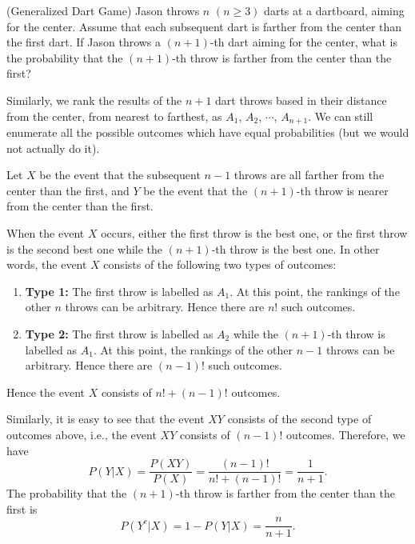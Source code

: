 \documentclass[12pt,letterpaper, onecolumn]{exam}
\begin{document}
\begin{questions}
    \question[](Generalized Dart Game) Jason throws $n$ $(n\ge 3)$ darts at a dartboard, aiming for the center. Assume that each subsequent dart is farther from the center than the first dart. If Jason throws a $(n+1)$-th dart aiming for the center, what is the probability that the $(n+1)$-th throw is farther from the center than the first?
    \begin{solution}
        Similarly, we rank the results of the $n+1$ dart throws based in their distance from the center, from nearest to farthest, as $A_1$, $A_2$, $\cdots$, $A_{n+1}$. We can still enumerate all the possible outcomes which have equal probabilities (but we would not actually do it). 
        
        \quad Let $X$ be the event that the subsequent $n-1$ throws are all farther from the center than the first, and $Y$ be the event that the $(n+1)$-th throw is nearer from the center than the first. 
        
        \quad When the event $X$ occurs, either the first throw is the best one, or the first throw is the second best one while the $(n+1)$-th throw is the best one. In other words, the event $X$ consists of the following two types of outcomes:
        \begin{enumerate}
            \item \textbf{Type 1:} The first throw is labelled as $A_1$. At this point, the rankings of the other $n$ throws can be arbitrary. Hence there are $n!$ such outcomes.
            \item \textbf{Type 2:} The first throw is labelled as $A_2$ while the $(n+1)$-th throw is labelled as $A_1$. At this point, the rankings of the other $n-1$ throws can be arbitrary. Hence there are $(n-1)!$ such outcomes.
        \end{enumerate}
         Hence the event $X$ consists of $n!+(n-1)!$ outcomes.

         \quad Similarly, it is easy to see that the event $XY$ consists of the second type of outcomes above, i.e., the event $XY$ consists of $(n-1)!$ outcomes. Therefore, we have 
         $$P(Y|X)=\frac{P(XY)}{P(X)}=\frac{(n-1)!}{n!+(n-1)!}=\frac{1}{n+1}.$$
         The probability that the $(n+1)$-th throw is farther from the center than the first is
         $$P(Y^c|X)=1-P(Y|X)=\frac{n}{n+1}.$$
    \end{solution}


\end{questions}
\end{document}
